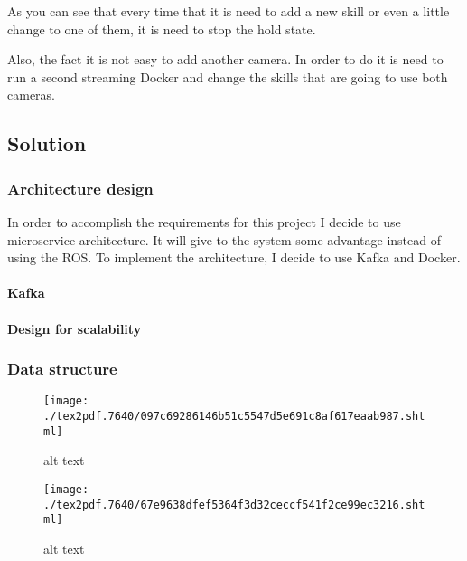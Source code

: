 \documentclass[]{article}
\let\oldparagraph\paragraph
\renewcommand{\paragraph}[1]{\oldparagraph{#1}\mbox{}}
\begin{document}
As you can see that every time that it is need to add a new skill or
even a little change to one of them, it is need to stop the hold state.

Also, the fact it is not easy to add another camera. In order to do it
is need to run a second streaming Docker and change the skills that are
going to use both cameras.

\hypertarget{solution}{%
\subsection{Solution}\label{solution}}

\hypertarget{architecture-design}{%
\subsubsection{Architecture design}\label{architecture-design}}

In order to accomplish the requirements for this project I decide to use
microservice architecture. It will give to the system some advantage
instead of using the ROS. To implement the architecture, I decide to use
Kafka and Docker.

\hypertarget{kafka-1}{%
\paragraph{Kafka}\label{kafka-1}}

\hypertarget{design-for-scalability}{%
\paragraph{Design for scalability}\label{design-for-scalability}}

\hypertarget{data-structure}{%
\subsubsection{Data structure}\label{data-structure}}

\begin{figure}
\centering
\texttt{[image: ./tex2pdf.7640/097c69286146b51c5547d5e691c8af617eaab987.shtml]}
\caption{alt text}
\end{figure}

\begin{figure}
\centering
\texttt{[image: ./tex2pdf.7640/67e9638dfef5364f3d32ceccf541f2ce99ec3216.shtml]}
\caption{alt text}
\end{figure}
\end{document}
